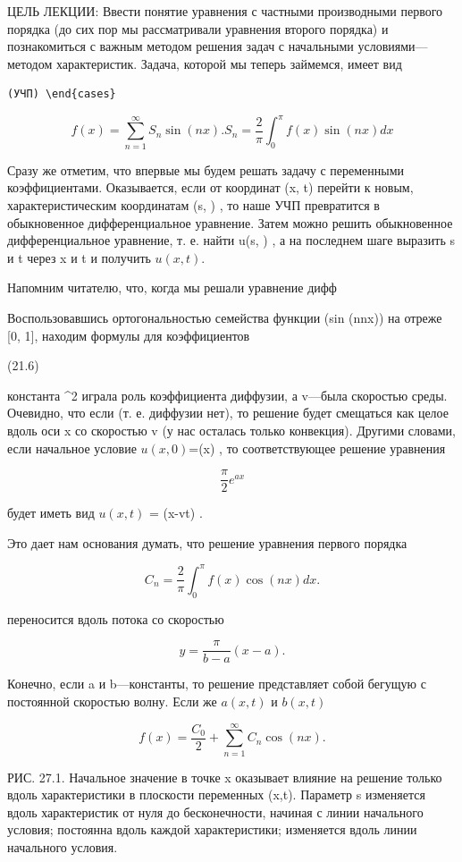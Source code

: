 \documentclass[
  ukrainian,
]{article}
\begin{document}
ЦЕЛЬ ЛЕКЦИИ: Ввести понятие уравнения с частными производными первого
порядка (до сих пор мы рассматривали уравнения второго порядка) и
познакомиться с важным методом решения задач с начальными
условиями---методом характеристик. Задача, которой мы теперь займемся,
имеет вид

\begin{verbatim}
(УЧП) \end{cases}
\end{verbatim}

\[
f(x) = \sum_{n=1}^{\infty} S_n \sin(nx).
S_n = \frac{2}{\pi} \int_{0}^{\pi} f(x) \sin(nx) dx
\]

Сразу же отметим, что впервые мы будем решать задачу с переменными
коэффициентами. Оказывается, если от координат (x, t) перейти к новым,
характеристическим координатам (s, \tau) , то наше УЧП превратится в
обыкновенное дифференциальное уравнение. Затем можно решить обыкновенное
дифференциальное уравнение, т. е. найти u(s, \tau) , а на последнем шаге
выразить s и t через x и t и получить \(u(x, t)\).

Напомним читателю, что, когда мы решали уравнение дифф

Воспользовавшись ортогональностью семейства функции (sin (nnx)) на
отреже {[}0, 1{]}, находим формулы для коэффициентов

(21.6)

константа \alpha\^{}2 играла роль коэффициента диффузии, а v---была
скоростью среды. Очевидно, что если  (т. е. диффузии нет), то
решение будет смещаться как целое вдоль оси x со скоростью v (у нас
осталась только конвекция). Другими словами, если начальное условие
\(u(x,0)\)=\varphi(x) , то соответствующее решение уравнения

\[
\frac{\pi}{2} e^{ax}
\]

будет иметь вид \(u(x, t)\) = \varphi(x-vt) .

Это дает нам основания думать, что решение уравнения первого порядка

\[
C_n = \frac{2}{\pi} \int_0^{\pi} f(x) \cos(nx) dx.
\]

переносится вдоль потока со скоростью

\[
y = \frac{\pi}{b-a}(x-a).
\]

Конечно, если a и b---константы, то решение представляет собой бегущую с
постоянной скоростью волну. Если же \(a(x, t)\) и \(b(x, t)\)

\[
f(x) = \frac{C_0}{2} + \sum_{n=1}^{\infty} C_n \cos(nx).
\]

РИС. 27.1. Начальное значение в точке x оказывает влияние на решение
только вдоль характеристики в плоскости переменных (x,t). Параметр s
изменяется вдоль характеристик от нуля до бесконечности, начиная с линии
начального условия; \tau   постоянна вдоль каждой характеристики;
\tau   изменяется вдоль линии начального условия.
\end{document}
